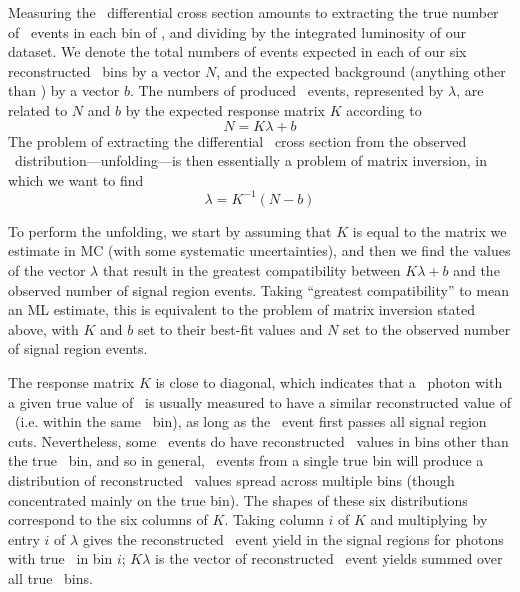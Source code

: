 Measuring the \zinvg\ differential cross section amounts to extracting the true number of \zinvg\ events in each bin of \pTgamma, and
dividing by the integrated luminosity of our dataset. We denote the total numbers of events expected in each of our six reconstructed
\ETgamma\ bins by a vector $N$, and the expected background (anything other than \zinvg) by a vector $b$. The numbers
of produced \zinvg\ events, represented by $\lambda$, are related to $N$ and $b$ by the expected response matrix $K$ according to
\begin{equation}
  N = K \lambda + b
\end{equation}
The problem of extracting the differential \zinvg\ cross section from the observed \ETgamma\ distribution---unfolding---is then essentially a problem
of matrix inversion, in which we want to find
\begin{equation}
  \lambda = K^{-1} (N - b)
\end{equation}

To perform the unfolding, we start by assuming that $K$ is equal to the
matrix we estimate in MC (with some systematic uncertainties), and then we find the values of the vector $\lambda$ that result in the greatest
compatibility between $K \lambda + b$ and the observed number of signal region events. Taking ``greatest compatibility'' to mean an ML
estimate, this is equivalent to the problem of matrix inversion
stated above, with $K$ and $b$ set to their best-fit values and $N$ set to the observed number of signal region events.

The response matrix $K$ is close to diagonal, which indicates that a \zinvg\ photon with a given true value of \pTgamma\ is usually measured
to have a similar reconstructed value of \ETgamma\ (i.e. within the same \ETgamma\ bin),
as long as the \zinvg\ event first passes all signal region cuts. Nevertheless, some \zinvg\ events do have reconstructed \ETgamma\ values
in bins other than the true \pTgamma\ bin, and so in general, \zinvg\ events from a single true \ETgamma bin will produce
a distribution of reconstructed \ETgamma\ values spread across multiple bins (though concentrated mainly on the true bin).
The shapes of these six distributions correspond to the six columns of $K$. Taking column $i$ of $K$ and multiplying by entry $i$ of $\lambda$ gives
the reconstructed \zinvg\ event yield in the signal regions for photons with true \pTgamma\ in bin $i$; $K \lambda$ is the vector of reconstructed \zinvg\ event yields summed
over all true \pTgamma\ bins.

